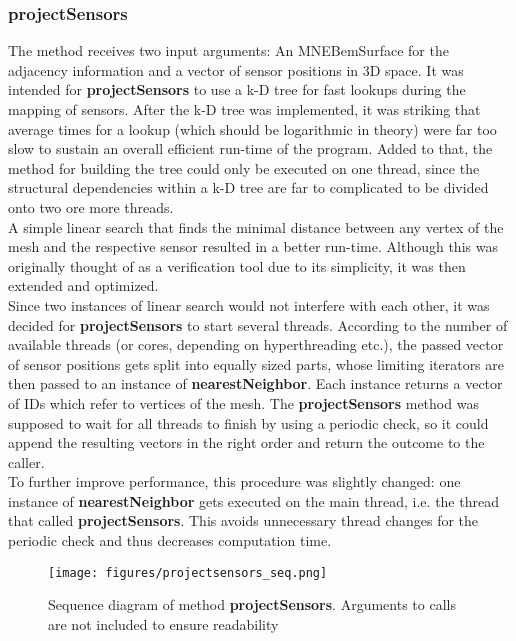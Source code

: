 \subsubsection{projectSensors}
The method  receives two input arguments: An MNEBemSurface for the adjacency information and a vector of sensor positions in 3D space. It was intended for \textbf{projectSensors} to use a k-D tree for fast lookups during the mapping of sensors. After the k-D tree was implemented, it was striking that average times for a lookup (which should be logarithmic in theory) were far too slow to sustain an overall efficient run-time of the program. Added to that, the method for building the tree could only be executed on one thread, since the structural dependencies within a k-D tree are far to complicated to be divided onto two ore more threads.\\
A simple linear search that finds the minimal distance between any vertex of the mesh and the respective sensor resulted in a better run-time. Although this was originally thought of as a verification tool due to its simplicity, it was then extended and optimized.\\
Since two instances of linear search would not interfere with each other, it was decided for \textbf{projectSensors} to start several threads.
According to the number of available threads (or cores, depending on hyperthreading etc.), the passed vector of sensor positions gets split into equally sized parts, whose limiting iterators are then passed to an instance of \textbf{nearestNeighbor}. Each instance returns a vector of IDs which refer to vertices of the mesh. The \textbf{projectSensors} method was supposed to wait for all threads to finish by using a periodic check, so it could append the resulting vectors in the right order and return the outcome to the caller.\\
To further improve performance, this procedure was slightly changed: one instance of \textbf{nearestNeighbor} gets executed on the main thread, i.e. the thread that called \textbf{projectSensors}. This avoids unnecessary thread changes for the periodic check and thus decreases computation time.

\clearpage

\begin{figure}[h]
	\begin{center}
		\texttt{[image: figures/projectsensors\_seq.png]}
		\caption{Sequence diagram of method \textbf{projectSensors}. Arguments to calls are not included to ensure readability}
	\end{center}
\end{figure}

